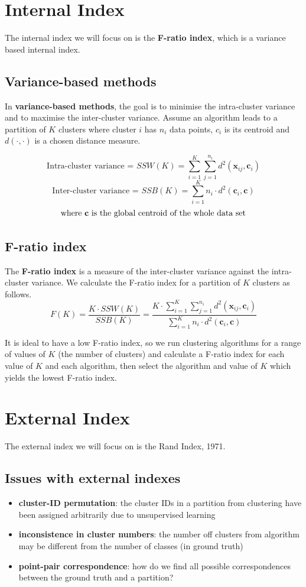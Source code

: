 \documentclass[11pt,fleqn]{book} %
\begin{document}
\section{Internal Index}
The internal index we will focus on is the \textbf{F-ratio index}, which is a variance based internal index.

\subsection*{Variance-based methods}
In \textbf{variance-based methods}, the goal is to minimise the intra-cluster variance and to maximise the inter-cluster variance. Assume an algorithm leads to a partition of $K$ clusters where cluster $i$ has $n_i$ data points, $c_i$ is its centroid and $d(\cdot,\cdot)$ is a chosen distance measure.

$$ \text{Intra-cluster variance = } SSW(K) = \sum^K_{i=1}\sum^{n_i}_{j=1}d^2(\mathbf{x}_{ij}, \mathbf{c}_i)$$
$$ \text{Inter-cluster variance = } SSB(K) = \sum^K_{i=1}n_i \cdot d^2(\mathbf{c}_i, \mathbf{c})$$
$$ \text{where \textbf{c} is the global centroid of the whole data set} $$

\subsection{F-ratio index}
The \textbf{F-ratio index} is a measure of the inter-cluster variance against the intra-cluster variance. We calculate the F-ratio index for a partition of $K$ clusters as follows.
$$ F(K) = \frac{K \cdot SSW(K)}{SSB(K)} = \frac{K \cdot \sum^K_{i=1}\sum^{n_i}_{j=1}d^2(\mathbf{x}_{ij}, \mathbf{c}_i)}{\sum^K_{i=1}n_i \cdot d^2(\mathbf{c}_i, \mathbf{c})}$$

\noindent
It is ideal to have a low F-ratio index, so we run clustering algorithms for a range of values of $K$ (the number of clusters) and calculate a F-ratio index for each value of $K$ and each algorithm, then select the algorithm and value of $K$ which yields the lowest F-ratio index.

\section{External Index}
The external index we will focus on is the Rand Index, 1971.

\subsection{Issues with external indexes}
\begin{itemize}
	\item \textbf{cluster-ID permutation}: the cluster IDs in a partition from clustering have been assigned arbitrarily due to unsupervised learning
	\item \textbf{inconsistence in cluster numbers}: the number off clusters from algorithm may be different from the number of classes (in ground truth)
	\item \textbf{point-pair correspondence}: how do we find all possible correspondences between the ground truth and a partition?
\end{itemize}
\end{document}
